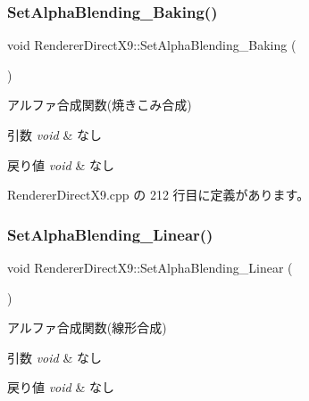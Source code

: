 \subsubsection{\texorpdfstring{Set\+Alpha\+Blending\+\_\+\+Baking()}{SetAlphaBlending\_Baking()}}
{\footnotesize\ttfamily void Renderer\+Direct\+X9\+::\+Set\+Alpha\+Blending\+\_\+\+Baking (\begin{DoxyParamCaption}{ }\end{DoxyParamCaption})}



アルファ合成関数(焼きこみ合成) 


\begin{DoxyParams}{引数}
{\em void} & なし \\
\hline
\end{DoxyParams}

\begin{DoxyRetVals}{戻り値}
{\em void} & なし \\
\hline
\end{DoxyRetVals}


 Renderer\+Direct\+X9.\+cpp の 212 行目に定義があります。

\mbox{\label{class_renderer_direct_x9_abfb5264cbb0bf3bacc7b4ec416ddc05a}} 
\subsubsection{\texorpdfstring{Set\+Alpha\+Blending\+\_\+\+Linear()}{SetAlphaBlending\_Linear()}}
{\footnotesize\ttfamily void Renderer\+Direct\+X9\+::\+Set\+Alpha\+Blending\+\_\+\+Linear (\begin{DoxyParamCaption}{ }\end{DoxyParamCaption})}



アルファ合成関数(線形合成) 


\begin{DoxyParams}{引数}
{\em void} & なし \\
\hline
\end{DoxyParams}

\begin{DoxyRetVals}{戻り値}
{\em void} & なし \\
\hline
\end{DoxyRetVals}


